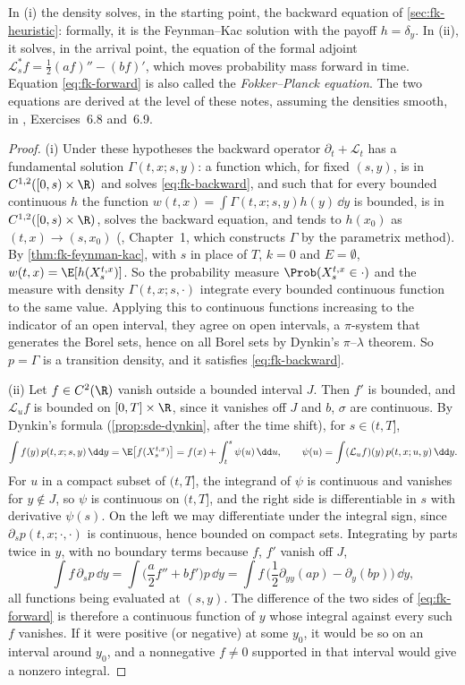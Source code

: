 In (i) the density solves, in the starting point, the backward equation of
\cref{sec:fk-heuristic}: formally, it is the Feynman--Kac solution with the payoff $h=\delta_y$.
In (ii), it solves, in the arrival point, the equation of the formal adjoint
$\mathcal L^*_sf=\frac12(af)''-(bf)'$, which moves probability mass forward in time. Equation
\eqref{eq:fk-forward} is also called the \emph{Fokker--Planck equation}. The two equations are
derived at the level of these notes, assuming the densities smooth, in
\textcite{shreve2}, Exercises~6.8 and~6.9.

\begin{proof}
(i) Under these hypotheses the backward operator $\partial_t+\mathcal L_t$ has a fundamental
solution $\Gamma(t,x;s,y)$: a function which, for fixed $(s,y)$, is in $C^{1,2}([0,s)\times\R)$ and
solves \eqref{eq:fk-backward}, and such that for every bounded continuous $h$ the function
$w(t,x)=\int\Gamma(t,x;s,y)h(y)\,\dd y$ is bounded, is in $C^{1,2}([0,s)\times\R)$, solves the backward
equation, and tends to $h(x_0)$ as $(t,x)\to(s,x_0)$ (\textcite{friedman-parabolic}, Chapter~1,
which constructs $\Gamma$ by the parametrix method). By \cref{thm:fk-feynman-kac}, with $s$ in place
of $T$, $k=0$ and $E=\emptyset$, $w(t,x)=\E[h(X^{t,x}_s)]$. So the probability measure
$\Prob(X^{t,x}_s\in\cdot)$ and the measure with density $\Gamma(t,x;s,\cdot)$ integrate every bounded
continuous function to the same value. Applying this to continuous functions increasing to the
indicator of an open interval, they agree on open intervals, a $\pi$-system that generates the Borel
sets, hence on all Borel sets by Dynkin's $\pi$--$\lambda$ theorem. So $p=\Gamma$ is a transition
density, and it satisfies \eqref{eq:fk-backward}.

(ii) Let $f\in C^2(\R)$ vanish outside a bounded interval $J$. Then $f'$ is bounded, and
$\mathcal L_uf$ is bounded on $[0,T]\times\R$, since it vanishes off $J$ and $b$, $\sigma$ are continuous.
By Dynkin's formula (\cref{prop:sde-dynkin}, after the time shift), for $s\in(t,T]$,
\[
  \int f(y)\,p(t,x;s,y)\,\dd y=\E\big[f(X^{t,x}_s)\big]=f(x)+\int_t^s\psi(u)\,\dd u,\qquad
  \psi(u)=\int(\mathcal L_uf)(y)\,p(t,x;u,y)\,\dd y .
\]
For $u$ in a compact subset of $(t,T]$, the integrand of $\psi$ is continuous and vanishes for
$y\notin J$, so $\psi$ is continuous on $(t,T]$, and the right side is differentiable in $s$ with
derivative $\psi(s)$. On the left we may differentiate under the integral sign, since
$\partial_sp(t,x;\cdot,\cdot)$ is continuous, hence bounded on compact sets. Integrating by parts
twice in $y$, with no boundary terms because $f$, $f'$ vanish off $J$,
\[
  \int f\,\partial_sp\,\dd y=\int\Big(\frac a2f''+bf'\Big)p\,\dd y
  =\int f\,\Big(\frac12\partial_{yy}(ap)-\partial_y(bp)\Big)\,\dd y ,
\]
all functions being evaluated at $(s,y)$. The difference of the two sides of
\eqref{eq:fk-forward} is therefore a continuous function of $y$ whose integral against every such
$f$ vanishes. If it were positive (or negative) at some $y_0$, it would be so on an interval
around $y_0$, and a nonnegative $f\ne0$ supported in that interval would give a nonzero integral.
\end{proof}


